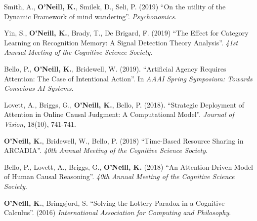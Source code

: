 Smith, A., \textbf{O'Neill, K.}, Smilek, D., Seli, P. (2019) ``On the
utility of the Dynamic Framework of mind
wandering''. \emph{Psychonomics}.

Yin, S., \textbf{O'Neill, K.}, Brady, T., De Brigard, F. (2019) ``The
Effect for Category Learning on Recognition Memory: A Signal Detection
Theory Analysis''. \emph{41st Annual Meeting of the Cognitive Science
Society}.

Bello, P., \textbf{O'Neill, K.}, Bridewell, W. (2019). ``Artificial
Agency Requires Attention: The Case of Intentional
Action''. In \emph{AAAI Spring Symposium: Towards Conscious AI
Systems}.

Lovett, A., Briggs, G., \textbf{O'Neill, K.}, Bello,
P. (2018). ``Strategic Deployment of Attention in Online Causal
Judgment: A Computational Model''. \emph{Journal of Vision}, 18(10),
741-741.

\textbf{O'Neill, K.}, Bridewell, W., Bello, P. (2018) ``Time-Based
Resource Sharing in ARCADIA''. \emph{40th Annual Meeting of the
  Cognitive Science Society}.

Bello, P., Lovett, A., Briggs, G., \textbf{O'Neill, K.} (2018) ``An
Attention-Driven Model of Human Causal Reasoning''. \emph{40th Annual
Meeting of the Cognitive Science Society}.
  
\textbf{O’Neill, K.}, Bringsjord, S. ``Solving the Lottery Paradox in a
Cognitive Calculus''. (2016) \emph{International Association for
Computing and Philosophy}.
